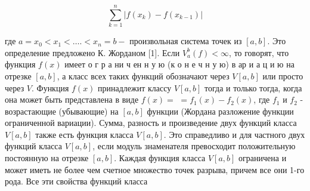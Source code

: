\documentclass[10pt]{article}
\begin{document}
\[

\sum_{k=1}^{n}\left|f\left(x_{k}\right)-f\left(x_{k-1}\right)\right|

\]



где $a=x_{0}<x_{1}<\ldots .<x_{n}=b-$ произвольная система точек из $[a, b]$. Это определение предложено К. Жорданом [1]. Если $V_{a}^{b}(f)<\infty$, то говорят, что функция $f(x)$ имеет о г р а ни ч ен н у ю (к о н е ч н у ю) в ар и а ц и ю на отрезке $[a, b]$, а класс всех таких функций обозначают через $V[a, b]$ или просто через $V$. Функция $f(x)$ принадлежит классу $V[a, b]$ тогда и только тогда, когда она может быть представлена в виде $f(x)=$ $=f_{1}(x)-f_{2}(x)$, где $f_{1}$ и $f_{2}$ - возрастающие (убывающие) на $[a, b]$ функции (Жордана разложение функции ограниченной вариации). Сумма, разность и произведение двух функций класса $V[a, b]$ также есть функция класса $V[a, b]$. Это справедливо и для частного двух функций класса $V[a, b]$, если модуль знаменателя превосходит положительную постоянную на отрезке $[a, b]$. Каждая функция класса $V[a, b]$ ограничена и может иметь не более чем счетное множество точек разрыва, причем все они 1-го рода. Все эти свойства функций класса
\end{document}

